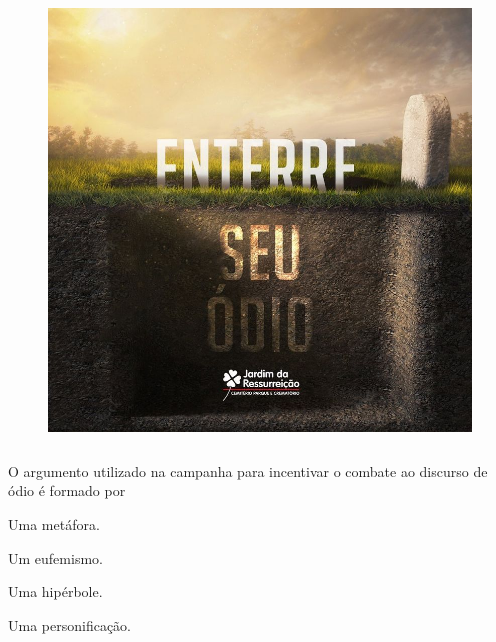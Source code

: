\begin{figure}[H]
\centering\includegraphics[width=4.65833in,height=4.65833in]{./imgSAEB_6_POR/media/image35.jpeg}
\end{figure}

\noindent O argumento utilizado na campanha para incentivar o combate ao discurso
de ódio é formado por

\begin{escolha}
\item Uma metáfora.
\item Um eufemismo.
\item Uma hipérbole.
\item Uma personificação.
\end{escolha}



